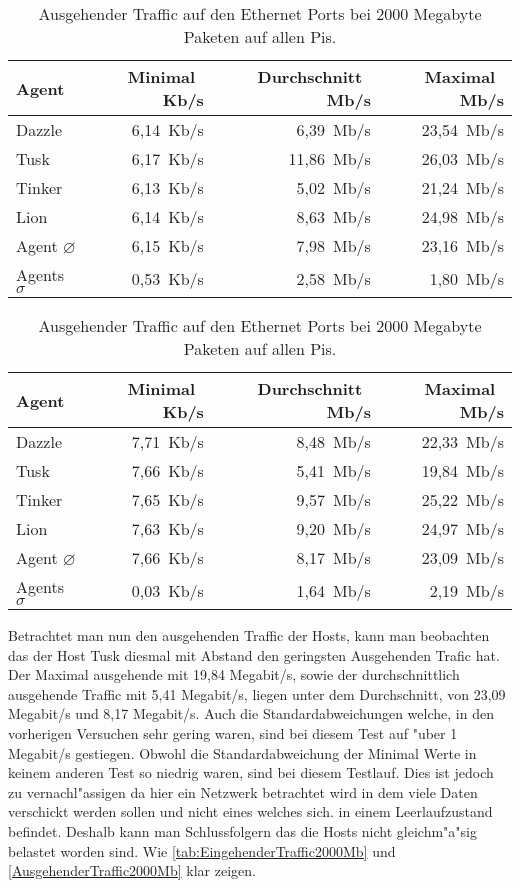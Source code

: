 \begin{table}
\centering
\begin{tabular}{l%
 r<{\,Kb/s}%
 r<{\,Mb/s}%
 r<{\,Mb/s}%
}
Agent  				& Minimal		& Durchschnitt		& Maximal	\\
\hline
Dazzle 				& 6,14			& 6,39 			& 23,54		\\
Tusk 				& 6,17			& 11,86			& 26,03		\\
Tinker				& 6,13			& 5,02			& 21,24		\\
Lion				& 6,14			& 8,63			& 24,98		\\ 
Agent $\diameter $	 	& 6,15			& 7,98			& 23,16		\\   
Agents $\sigma $		& 0,53			& 2,58			& 1,80		\\

\end{tabular}
\caption{Eingehender Traffic auf den Ethernet Ports bei 2000 Megabyte Paketen auf allen Pis.}
\label{tab:EingehenderTraffic2000Mb}
\begin{tabular}{l%
 r<{\,Kb/s}%
 r<{\,Mb/s}%
 r<{\,Mb/s}%
}
Agent  				& Minimal		& Durchschnitt		& Maximal	\\	
\hline
Dazzle 				& 7,71			& 8,48	 		& 22,33		\\
Tusk 				& 7,66			& 5,41			& 19,84		\\
Tinker				& 7,65			& 9,57			& 25,22		\\
Lion				& 7,63			& 9,20			& 24,97		\\ 
Agent $\diameter $	 	& 7,66			& 8,17			& 23,09		\\   
Agents $\sigma $		& 0,03			& 1,64			& 2,19		\\

\end{tabular}
\caption{Ausgehender Traffic auf den Ethernet Ports bei 2000 Megabyte Paketen auf allen Pis.}
\label{tab:AusgehenderTraffic2000Mb}

\end{table}

Betrachtet man nun den ausgehenden Traffic der Hosts, kann man beobachten das der Host Tusk %
diesmal mit Abstand den geringsten Ausgehenden Trafic hat. Der Maximal ausgehende mit 19,84 Megabit/s, %
sowie der durchschnittlich ausgehende Traffic mit 5,41 Megabit/s, liegen unter dem Durchschnitt, von 23,09 %
Megabit/s und 8,17 Megabit/s. Auch die Standardabweichungen welche, in den vorherigen Versuchen sehr gering %
waren, sind bei diesem Test auf "uber 1 Megabit/s gestiegen. Obwohl die Standardabweichung der Minimal %
Werte in keinem anderen Test so niedrig waren, sind bei diesem Testlauf. Dies ist jedoch zu vernachl"assigen %
da hier ein Netzwerk betrachtet wird in dem viele Daten verschickt werden sollen und nicht eines welches sich. %
in einem Leerlaufzustand befindet. Deshalb kann man Schlussfolgern das die Hosts nicht gleichm"a"sig %
belastet worden sind. Wie \cref{tab:EingehenderTraffic2000Mb} und \cref{AusgehenderTraffic2000Mb} klar zeigen.  %


